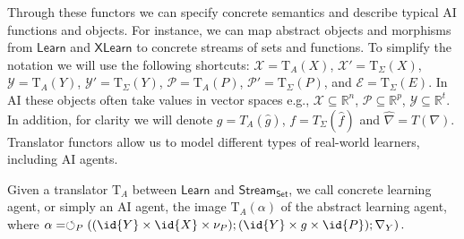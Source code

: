 Through these functors we can specify concrete semantics and describe typical AI functions and objects. For instance, we can map abstract objects and morphisms from $\mathsf{Learn}$ and $\mathsf{XLearn}$ to concrete streams of sets and functions. To simplify the notation we will use the following shortcuts: $\mathcal{X} = \mathrm{T}_A(X)$, $\mathcal{X'} = \mathrm{T}_{\Sigma}(X)$, $\mathcal{Y} = \mathrm{T}_A(Y)$, $\mathcal{Y'} = \mathrm{T}_{\Sigma}(Y)$, $\mathcal{P} = \mathrm{T}_A(P)$, $\mathcal{P'} = \mathrm{T}_{\Sigma}(P)$, and $\mathcal{E} = \mathrm{T}_{\Sigma}(E)$. In AI these objects often take values in vector spaces e.g., $\mathcal{X} \subseteq \mathbb{R}^n$, $\mathcal{P} \subseteq \mathbb{R}^p$, $\mathcal{Y} \subseteq \mathbb{R}^t$. In addition, for clarity we will denote $g=T_A(\hat{g})$, $f=T_{\Sigma}(\hat{f})$ and $\hat{\nabla}=T(\nabla)$.
Translator functors allow us to model different types of real-world learners, including AI agents.
\begin{definition}
Given a translator $\mathrm{T}_A$ between $\mathsf{Learn}$ and $\mathsf{Stream_{Set}}$, we call concrete learning agent, or simply an AI agent, the image $\mathrm{T}_A(\alpha)$ of the abstract learning agent, where
${\displaystyle \alpha = \fbk[P]\left((\id{Y}\times\id{X}\times\nu_P);(\id{Y}\times g \times \id{P});\nabla_Y\right).}$
\end{definition}
